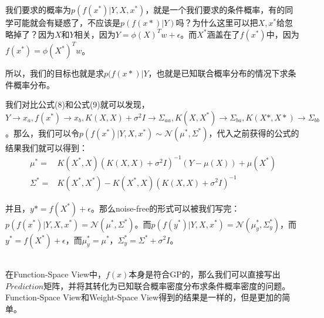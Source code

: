 \documentclass[a4paper]{article}
\begin{document}
我们要求的概率为$p(f(x^\ast)|Y,X,x^\ast)$，就是一个我们要求的条件概率，有的同学可能就会有疑惑了，不应该是$p(f(x\ast)|Y)$吗？为什么这里可以把$X,x^\ast$给忽略掉了？因为$X$和$Y$相关，因为$Y=\phi(X)^Tw+\epsilon$。而$X^\ast$涵盖在了$f(x^\ast)$中，因为$f(x^\ast) = \phi(X^\ast)^Tw$。


所以，我们的目标也就是求$p(f(x\ast)|Y$，也就是{\color{red}已知联合概率分布的情况下求条件概率分布。}

我们对比公式(8)和公式(9)就可以发现，$Y\rightarrow x_a,f(x^\ast)\rightarrow x_b,K(X,X)+\sigma^2I \rightarrow \Sigma_{aa},K(X,X^\ast) \rightarrow \Sigma_{ba},K(X\ast,X\ast)\rightarrow \Sigma_{bb}$。那么，我们可以令$p(f(x^\ast)|Y,X,x^\ast)\sim\mathcal{N}(\mu^\ast,\Sigma^\ast)$，代入之前获得的公式的结果我们就可以得到：
\begin{equation}
    \begin{split}
        \mu^\ast = & K(X^\ast,X)(K(X,X)+\sigma^2I)^{-1}(Y-\mu(X))+\mu(X^\ast) \\
        \Sigma^\ast = & 
        K(X^\ast,X^\ast)-K(X^\ast,X)(K(X,X)+\sigma^2I)^{-1}
    \end{split}
\end{equation}

并且，$y\ast = f(X^\ast) + \epsilon$。那么noise-free的形式可以被我们写完：$p(f(x^\ast)|Y,X,x^\ast) = \mathcal{N}(\mu^\ast,\Sigma^\ast)$。而$p(f(y^\ast)|Y,X,x^\ast) = \mathcal{N}(\mu^\ast_y,\Sigma^\ast_y)$，而$y^\ast = f(X^\ast) + \epsilon$，而$\mu_{y}^\ast = \mu^{\ast}$，$\Sigma_y^{\ast} = \Sigma^\ast + \sigma^2I$。

~\\

在Function-Space View中，$f(x)$本身是符合GP的，那么我们可以直接写出$Prediction$矩阵，并将其转化为已知联合概率密度分布求条件概率密度的问题。Function-Space View和Weight-Space View得到的结果是一样的，但是更加的简单。
\end{document}
